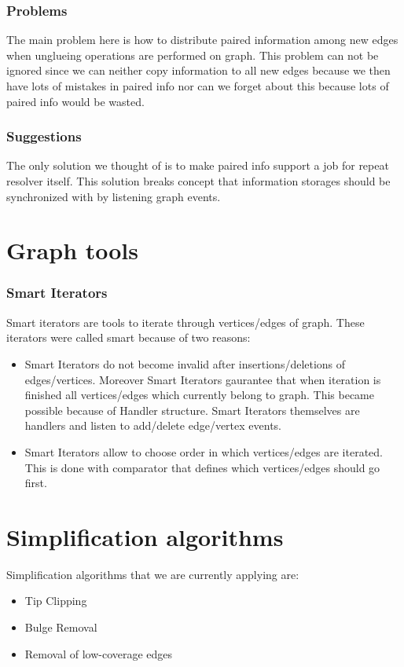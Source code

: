 \documentclass[12pt]{article}
\begin{document}
\subsubsection{Problems}

The main problem here is how to distribute paired information among new edges when unglueing operations are performed on graph. This problem can not be ignored since we can neither copy information to all new edges because we then have lots of mistakes in paired info nor can we forget about this because lots of paired info would be wasted.

\subsubsection{Suggestions}

The only solution we thought of is to make paired info support a job for repeat resolver itself. This solution breaks concept that information storages should be synchronized with by listening graph events.

\section{Graph tools}
\subsubsection{Smart Iterators}

Smart iterators are tools to iterate through vertices/edges of graph. These iterators were called smart because of two reasons:
\begin{itemize}
\item Smart Iterators do not become invalid after insertions/deletions of edges/vertices. Moreover Smart Iterators gaurantee that when iteration is finished all vertices/edges which currently belong to graph. This became possible because of Handler structure. Smart Iterators themselves are handlers and listen to add/delete edge/vertex events.
\item Smart Iterators allow to choose order in which vertices/edges are iterated. This is done with comparator that defines which vertices/edges should go first.
\end{itemize}

\section{Simplification algorithms}
Simplification algorithms that we are currently applying are:
\begin{itemize}
\item Tip Clipping
\item Bulge Removal
\item Removal of low-coverage edges
\end{itemize}
\end{document}
